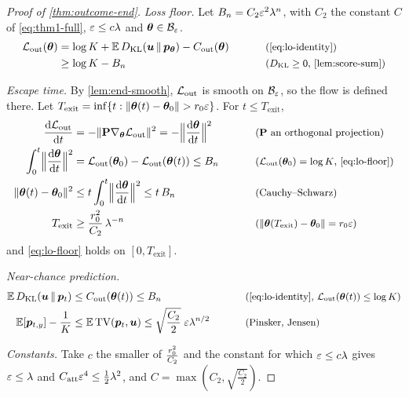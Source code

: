 \begin{proof}[Proof of \cref{thm:outcome-end}]
\emph{Loss floor.} Let $B_n=C_2\varepsilon^2\lambda^n$, with $C_2$ the constant $C$ of \cref{eq:thm1-full}, $\varepsilon\le c\lambda$ and $\bm\theta\in\mathcal B_{\varepsilon}$.
\begin{alignat}{2}
 \Lout(\bm\theta)&=\log K+\E\,\KL(\bm u\,\|\,\bm p_{\bm\theta})-\outcredit(\bm\theta) &\qquad& \why{\cref{eq:lo-identity}}\nonumber\\
 &\ge\log K-B_n && \why{$\KL\ge0$, \cref{lem:score-sum}}\label{eq:lo-floor}
\end{alignat}

\emph{Escape time.} By \cref{lem:end-smooth}, $\mathcal L_{\mathrm{out}}$ is smooth on $\mathcal B_{\varepsilon}$, so the flow is defined there. Let
$T_{\mathrm{exit}}=\inf\{t:\|\bm\theta(t)-\bm\theta_0\|>\ballradius\initscale\}$. For $t\le T_{\mathrm{exit}}$,
\begin{alignat*}{2}
 \ddt{\Lout}&=-\|\mathbf P\nabla_{\bm\theta}\Lout\|^2=-\Bigl\|\ddt{\bm\theta}\Bigr\|^2 &\qquad& \why{$\mathbf P$ an orthogonal projection}\\
 \int_0^t\Bigl\|\ddt{\bm\theta}\Bigr\|^2&=\Lout(\bm\theta_0)-\Lout(\bm\theta(t))\le B_n && \why{$\Lout(\bm\theta_0)=\log K$, \cref{eq:lo-floor}}\\
 \|\bm\theta(t)-\bm\theta_0\|^2&\le t\int_0^t\Bigl\|\ddt{\bm\theta}\Bigr\|^2\le t\,B_n && \why{Cauchy--Schwarz}\\
 T_{\mathrm{exit}}&\ge\frac{\ballradius^2}{C_2}\,\mixrate^{-n} && \why{$\|\bm\theta(T_{\mathrm{exit}})-\bm\theta_0\|=\ballradius\initscale$}
\end{alignat*}
and \cref{eq:lo-floor} holds on $[0,T_{\mathrm{exit}}]$.

\emph{Near-chance prediction.}
\begin{alignat*}{2}
 \E\,\KL(\bm u\,\|\,\bm p_t)&\le\outcredit(\bm\theta(t))\le B_n &\qquad& \why{\cref{eq:lo-identity}, $\Lout(\bm\theta(t))\le\log K$}\\
 \E[\bm p_{t,y}]-\tfrac{1}{K}&\le\E\,\mathrm{TV}(\bm p_t,\bm u)\le\sqrt{\frac{C_2}{2}}\;\initscale\mixrate^{n/2} && \why{Pinsker, Jensen}
\end{alignat*}

\emph{Constants.} Take $c$ the smaller of $\frac{r_0^2}{C_2}$ and the constant for which $\varepsilon\le c\lambda$ gives $\varepsilon\le\lambda$ and
$C_{\mathrm{att}}\varepsilon^4\le\frac{1}{2}\lambda^2$, and $C=\max(C_2,\sqrt{\frac{C_2}{2}})$.
\end{proof}
